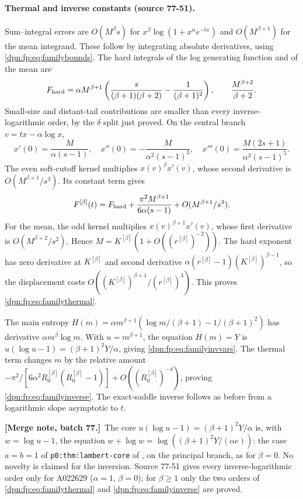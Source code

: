 \documentclass[11pt]{article}
\numberwithin{equation}{section}
\theoremstyle{definition}\newtheorem{definition}[theorem]{Definition}
\theoremstyle{remark}\newtheorem{remark}[theorem]{Remark}
\newcommand{\src}[1]{\textup{(source #1)}}
\newcommand{\mergenotec}[1]{\par\smallskip\noindent\textbf{[Merge note, batch 77.]}\ #1\par\smallskip}
\begin{document}
\paragraph{Thermal and inverse constants \src{77-51}.}
Sum--integral errors are $O(M^\beta s)$ for $x^\beta\log(1+x^\alpha e^{-tx})$
and $O(M^{\beta+1})$ for the mean integrand.  These follow by integrating
absolute derivatives, using \eqref{dpn:fp:eq:familybounds}.  The hard
integrals of the log generating function and of the mean are
\[
 F_{\rm hard}=\alpha M^{\beta+1}\left(\frac{s}{(\beta+1)(\beta+2)}-\frac1{(\beta+1)^2}\right),
 \qquad \frac{M^{\beta+2}}{\beta+2}.
\]
Small-size and distant-tail contributions are smaller than every
inverse-logarithmic order, by the $\delta$ split just proved.  On the central
branch $v=tx-\alpha\log x$,
\[
 x'(0)=\frac M{\alpha(s-1)},\quad
 x''(0)=-\frac M{\alpha^2(s-1)^3},\quad
 x'''(0)=\frac{M(2s+1)}{\alpha^3(s-1)^5}.
\]
The even soft-cutoff kernel multiplies $x(v)^\beta x'(v)$, whose second
derivative is $O(M^{\beta+1}/s^3)$.  Its constant term gives
\[
 F^{[\beta]}(t)=F_{\rm hard}+\frac{\pi^2M^{\beta+1}}{6\alpha(s-1)}+O(M^{\beta+1}/s^3).
\]
For the mean, the odd kernel multiplies $x(v)^{\beta+1}x'(v)$, whose first
derivative is $O(M^{\beta+2}/s^2)$.  Hence $M=K^{[\beta]}(1+O((r^{[\beta]})^{-2}))$.  The
hard exponent has zero derivative at $K^{[\beta]}$ and second derivative
$\alpha(r^{[\beta]}-1)(K^{[\beta]})^{\beta-1}$, so the displacement costs
$O((K^{[\beta]})^{\beta+1}/(r^{[\beta]})^3)$.  This proves \eqref{dpn:fp:eq:familythermal}.

The main entropy $H(m)=\alpha m^{\beta+1}(\log m/(\beta+1)-1/(\beta+1)^2)$ has
derivative $\alpha m^\beta\log m$.  With $u=m^{\beta+1}$, the equation $H(m)=Y$
is $u(\log u-1)=(\beta+1)^2Y/\alpha$, giving \eqref{dpn:fp:eq:familyinvvars}.
The thermal term changes $m$ by the relative amount
$-\pi^2/[6\alpha^2R^{[\beta]}_0(R^{[\beta]}_0-1)]+O((R^{[\beta]}_0)^{-4})$, proving
\eqref{dpn:fp:eq:familyinverse}.  The exact-saddle inverse follows as before
from a logarithmic slope asymptotic to $t$.
\mergenotec{The core $u(\log u-1)=(\beta+1)^2Y/\alpha$ is, with
$w=\log u-1$, the equation $w+\log w=\log((\beta+1)^2Y/(\alpha e))$: the case
$a=b=1$ of \texttt{p0:thm:lambert-core} of \cite{tai}, on the principal
branch, as for $\beta=0$.  No novelty is claimed for the inversion.  Source
77-51 gives every inverse-logarithmic order only for A022629 ($\alpha=1$,
$\beta=0$); for $\beta\ge1$ only the two orders of
\eqref{dpn:fp:eq:familythermal} and \eqref{dpn:fp:eq:familyinverse} are proved.}
\end{document}
